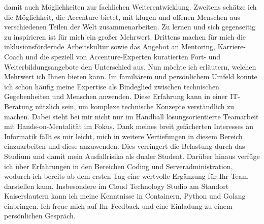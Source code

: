 \documentclass[11pt,a4paper,sans]{moderncv}        %
\begin{document}
damit auch Möglichkeiten zur fachlichen Weiterentwicklung.\newline \newline
Zweitens schätze ich die Möglichkeit, die Accenture bietet, mit klugen und offenen Menschen aus verschiedenen Teilen der Welt zusammenarbeiten. Zu lernen und sich gegenseitig zu inspirieren ist für mich ein großer Mehrwert.\newline \newline
Drittens machen für mich die inklusionsfördernde Arbeitskultur sowie das Angebot an Mentoring, Karriere-Coach und die speziell von Accenture-Experten kuratierten Fort- und Weiterbildungsangebote den Unterschied aus.\newline \newline
Nun möchte ich erläutern, welchen Mehrwert ich Ihnen bieten kann.\newline \newline
Im familiärem und persönlichem Umfeld konnte ich schon häufig meine Expertise als Bindeglied zwischen technischen Gegebenheiten und Menschen anwenden. Diese Erfahrung kann in einer IT-Beratung nützlich sein, um komplexe technische Konzepte verständlich zu machen. Dabei steht bei mir nicht nur im Handball lösungsorientierte Teamarbeit mit Hands-on-Mentalität im Fokus.\newline \newline
Dank meines breit gefächerten Interesses an Informatik fällt es mir leicht, mich in weitere Vertiefungen in diesem Bereich einzuarbeiten und diese anzuwenden. Dies verringert die Belastung durch das Studium und damit mein Ausfallrisiko als dualer Student.\newline \newline
Darüber hinaus verfüge ich über Erfahrungen in den Bereichen Coding und Serveradministration, wodurch ich bereits ab dem ersten Tag eine wertvolle Ergänzung für Ihr Team darstellen kann. Insbesondere im Cloud Technology Studio am Standort Kaiserslautern kann ich meine Kenntnisse in Containern, Python und Golang einbringen.\newline \newline
Ich freue mich auf Ihr Feedback und eine Einladung zu einem persönlichen Gespräch.\newline
\end{document}
